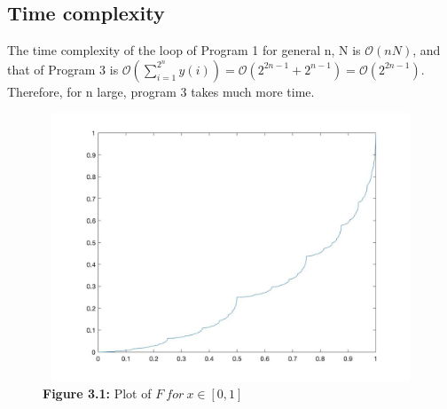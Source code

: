 \documentclass[11pt]{article}
\begin{document}
\subsection*{Time complexity}
The time complexity of the loop of Program 1 for general n, N is $\mathcal{O}\left(nN\right)$, and that of Program 3 is $\mathcal{O}\left(\sum_{i=1}^{2^{n}}y(i)\right) = \mathcal{O}\left(2^{2n-1}+2^{n-1}\right) = \mathcal{O}\left(2^{2n-1}\right)$. Therefore, for n large, program 3 takes much more time.
\begin{figure}
\includegraphics[width=13cm,height=8cm]{Q2}
\caption{\textbf{Figure 3.1:} Plot of $F \ for\ x\in\left[0,1\right]$}
\end{figure}

\pagebreak
%
\end{document}
